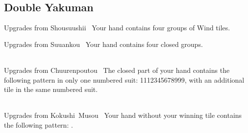 \subsection{Double Yakuman}\label{core:ssec:double-yakuman-yaku}

	{\upgradesfrom Upgrades from Shousuushii~}
	{Your hand contains four groups of Wind tiles.}

	{\upgradesfrom Upgrades from Suuankou~}
	{Your hand contains four closed groups.}

	{\closedhand \\
	\upgradesfrom Upgrades from Chuurenpoutou~}
	{The closed part of your hand contains the following pattern in only one numbered suit: 1112345678999, with an additional tile in the same numbered suit.}

	{\closedhand \\
	\upgradesfrom Upgrades from Kokushi~Musou~}
	{Your hand without your winning tile contains the following pattern: {}.}